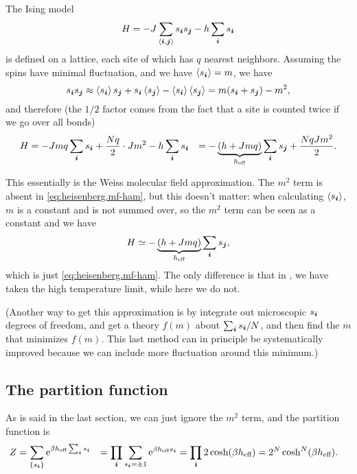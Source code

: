 \documentclass[hyperref, a4paper]{article}
\newcommand*{\ee}{\mathrm{e}}
\newcommand*{\pair}[1]{\langle #1 \rangle}
\def\\{}%
\begin{document}
The Ising model 
\begin{equation}
    H = - J \sum_{\pair{\vb*{i}, \vb*{j}}} s_{\vb*{i}} s_{\vb*{j}} - h \sum_{\vb*{i}} s_{\vb*{i}}
\end{equation}
is defined on a lattice,
each site of which has $q$ nearest neighbors.
Assuming the spins have minimal fluctuation, 
and we have $\expval{s_{\vb*{i}}} = m$, 
we have 
\[
    s_{\vb*{i}} s_{\vb*{j}} \approx 
    \expval{s_{\vb*{i}}} s_{\vb*{j}} + s_{\vb*{i}} \expval{s_{\vb*{j}}} 
    - \expval{s_{\vb*{i}}} \expval{s_{\vb*{j}}} = 
    m (s_{\vb*{i}} + s_{\vb*{j}}) - m^2,
\]
and therefore (the $1/2$ factor comes from the fact that a site is counted twice 
if we go over all bonds)
\begin{equation}
    \begin{aligned}
        H &= - J m q \sum_{\vb*{i}} s_{\vb*{i}} 
        + \frac{N q}{2} \cdot J m^2 - h \sum_{\vb*{i}} s_{\vb*{i}} \\
        &= - \underbrace{(h + Jmq)}_{h_{\text{eff}}} \sum_{\vb*{i}} s_{\vb*{j}} 
        + \frac{NqJm^2}{2} .
    \end{aligned}
\end{equation}

This essentially is the Weiss molecular field approximation.
The $m^2$ term is absent in \eqref{eq:heisenberg.mf-ham}, 
but this doesn't matter: 
when calculating $\expval{s_{\vb*{i}}}$, 
$m$ is a constant and is not summed over, 
so the $m^2$ term can be seen as a constant 
and we have 
\[
    H \simeq - \underbrace{(h + Jmq)}_{h_{\text{eff}}} \sum_{\vb*{i}} s_{\vb*{j}} ,
\]
which is just \eqref{eq:heisenberg.mf-ham}.
The only difference is that in ,
we have taken the high temperature limit, 
while here we do not.

(Another way to get this approximation is 
by integrate out microscopic $s_{\vb*{i}}$ degrees of freedom, 
and get a theory $f(m)$ about $\sum_{\vb*{i}} s_{\vb*{i}} / N$, 
and then find the $m$ that minimizes $f(m)$.
This last method can in principle be systematically improved 
because we can include more fluctuation around this minimum.) 

\subsection{The partition function}

As is said in the last section, 
we can just ignore the $m^2$ term, 
and the partition function is 
\begin{equation}
    \begin{aligned}
        Z &= \sum_{\{s_{\vb*{i}}\}} \ee^{ \beta h_{\text{eff}} \sum_{\vb*{i}} s_{\vb*{i}}} \\
        &= \prod_{\vb*{i}} \sum_{s_{\vb*{i}} = \pm 1} 
        \ee^{\beta h_{\text{eff}} s_{\vb*{i}}} = \prod_{\vb*{i}} 2 \cosh (\beta h_{\text{eff}}) \\
        &= 2^N \cosh^N (\beta h_{\text{eff}}). 
    \end{aligned} 
\end{equation}
\end{document}
